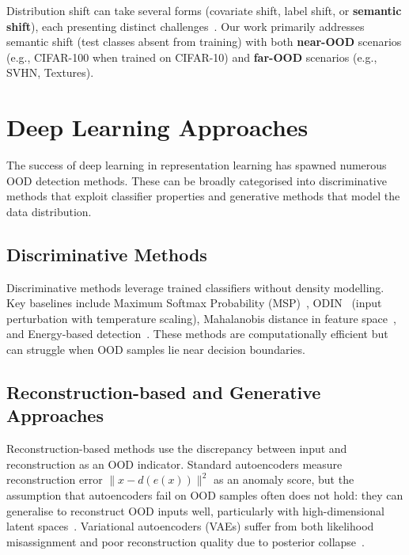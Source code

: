 Distribution shift can take several forms (covariate shift, label shift, or \textbf{semantic shift}), each presenting distinct challenges~\cite{yang2021generalized}. Our work primarily addresses semantic shift (test classes absent from training) with both \textbf{near-OOD} scenarios (e.g., CIFAR-100 when trained on CIFAR-10) and \textbf{far-OOD} scenarios (e.g., SVHN, Textures).

\section{Deep Learning Approaches}
\label{sec:bg:deeplearning}

The success of deep learning in representation learning has spawned numerous OOD detection methods. These can be broadly categorised into discriminative methods that exploit classifier properties and generative methods that model the data distribution.

\subsection{Discriminative Methods}
\label{sec:bg:deeplearning:discriminative}

Discriminative methods leverage trained classifiers without density modelling. Key baselines include Maximum Softmax Probability (MSP)~\cite{hendrycks2017baseline}, ODIN~\cite{liang2018enhancing} (input perturbation with temperature scaling), Mahalanobis distance in feature space~\cite{lee2018simple}, and Energy-based detection~\cite{liu2020energy}. These methods are computationally efficient but can struggle when OOD samples lie near decision boundaries.

\subsection{Reconstruction-based and Generative Approaches}
\label{sec:bg:deeplearning:reconstruction}

Reconstruction-based methods use the discrepancy between input and reconstruction as an OOD indicator. Standard autoencoders measure reconstruction error $\|x - d(e(x))\|^2$ as an anomaly score, but the assumption that autoencoders fail on OOD samples often does not hold: they can generalise to reconstruct OOD inputs well, particularly with high-dimensional latent spaces~\cite{baur2021autoencoders}. Variational autoencoders (VAEs) suffer from both likelihood misassignment and poor reconstruction quality due to posterior collapse~\cite{an2015variational}.

